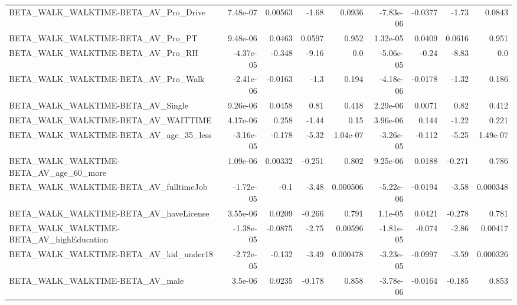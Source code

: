 \begin{tabular}{lrrrrrrrr}
BETA\_WALK\_WALKTIME-BETA\_AV\_Pro\_Drive               &    7.48e-07 &      0.00563 &     -1.68 &   0.0936 &  -7.83e-06 &     -0.0377 &        -1.73 &        0.0843 \\
BETA\_WALK\_WALKTIME-BETA\_AV\_Pro\_PT                  &    9.48e-06 &       0.0463 &    0.0597 &    0.952 &   1.32e-05 &      0.0409 &       0.0616 &         0.951 \\
BETA\_WALK\_WALKTIME-BETA\_AV\_Pro\_RH                  &   -4.37e-05 &       -0.348 &     -9.16 &      0.0 &  -5.06e-05 &       -0.24 &        -8.83 &           0.0 \\
BETA\_WALK\_WALKTIME-BETA\_AV\_Pro\_Walk                &   -2.41e-06 &      -0.0163 &      -1.3 &    0.194 &  -4.18e-06 &     -0.0178 &        -1.32 &         0.186 \\
BETA\_WALK\_WALKTIME-BETA\_AV\_Single                  &    9.26e-06 &       0.0458 &      0.81 &    0.418 &   2.29e-06 &      0.0071 &         0.82 &         0.412 \\
BETA\_WALK\_WALKTIME-BETA\_AV\_WAITTIME                &    4.17e-06 &        0.258 &     -1.44 &     0.15 &   3.96e-06 &       0.144 &        -1.22 &         0.221 \\
BETA\_WALK\_WALKTIME-BETA\_AV\_age\_35\_less             &   -3.16e-05 &       -0.178 &     -5.32 & 1.04e-07 &  -3.26e-05 &      -0.112 &        -5.25 &      1.49e-07 \\
BETA\_WALK\_WALKTIME-BETA\_AV\_age\_60\_more             &    1.09e-06 &      0.00332 &    -0.251 &    0.802 &   9.25e-06 &      0.0188 &       -0.271 &         0.786 \\
BETA\_WALK\_WALKTIME-BETA\_AV\_fulltimeJob             &   -1.72e-05 &         -0.1 &     -3.48 & 0.000506 &  -5.22e-06 &     -0.0194 &        -3.58 &      0.000348 \\
BETA\_WALK\_WALKTIME-BETA\_AV\_haveLicense             &    3.55e-06 &       0.0209 &    -0.266 &    0.791 &    1.1e-05 &      0.0421 &       -0.278 &         0.781 \\
BETA\_WALK\_WALKTIME-BETA\_AV\_highEducation           &   -1.38e-05 &      -0.0875 &     -2.75 &  0.00596 &  -1.81e-05 &      -0.074 &        -2.86 &       0.00417 \\
BETA\_WALK\_WALKTIME-BETA\_AV\_kid\_under18             &   -2.72e-05 &       -0.132 &     -3.49 & 0.000478 &  -3.23e-05 &     -0.0997 &        -3.59 &      0.000326 \\
BETA\_WALK\_WALKTIME-BETA\_AV\_male                    &     3.5e-06 &       0.0235 &    -0.178 &    0.858 &  -3.78e-06 &     -0.0164 &       -0.185 &         0.853 \\

\end{tabular}
